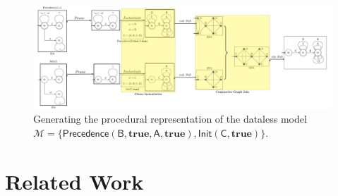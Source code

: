 \documentclass[sigconf]{acmart}
\begin{document}
\begin{figure}[!t]
\hspace*{-.25cm}
\includegraphics[width=\linewidth]{fig/transform}
\caption{Generating the procedural representation of the dataless model $\mathcal{M}=\{\textsf{Precedence}(\textsf{B},\textbf{true},\textsf{A},\textbf{true}),\textsf{Init}(\textsf{C},\textbf{true})\}$.}\label{fig:transform}
\end{figure}
\section{Related Work}\label{sec:RW}
\end{document}
